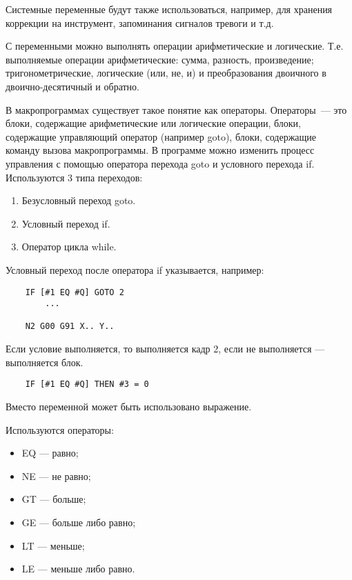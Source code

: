 Системные переменные будут также использоваться, например, для хранения коррекции на инструмент, запоминания сигналов тревоги и т.д.

С переменными можно выполнять операции арифметические и логические. Т.е. выполняемые операции арифметические: сумма, разность, произведение; тригонометрические, логические (или, не, и) и преобразования двоичного в двоично-десятичный и обратно.

В макропрограммах существует такое понятие как операторы. Операторы~--- это блоки, содержащие арифметические или логические операции, блоки, содержащие управляющий оператор (например goto), блоки, содержащие команду вызова макропрограммы. В программе можно изменить процесс управления с помощью оператора перехода goto и условного перехода if. Используются 3 типа переходов:

\begin{enumerate}
    \item Безусловный переход goto.
    \item Условный переход if.
    \item Оператор цикла while.
\end{enumerate}

Условный переход после оператора if указывается, например:

\begin{verbatim}
    IF [#1 EQ #Q] GOTO 2
        ...

    N2 G00 G91 X.. Y..

\end{verbatim}

Если условие выполняется, то выполняется кадр 2, если не выполняется --- выполняется блок.

\begin{verbatim}
    IF [#1 EQ #Q] THEN #3 = 0
\end{verbatim}

Вместо переменной может быть использовано выражение.

Используются операторы:

\begin{itemize}
    \item EQ --- равно;
    \item NE --- не равно;
    \item GT --- больше;
    \item GE --- больше либо равно;
    \item LT --- меньше;
    \item LE --- меньше либо равно.
\end{itemize}

